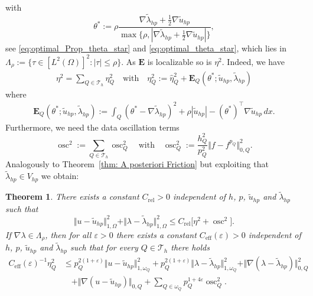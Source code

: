 \documentclass[12pt,twoside,reqno]{amsart}
\newtheorem{theorem}{Theorem}[section]
\theoremstyle{definition}
\numberwithin{equation}{section}
\newcommand{\E} {\bm{E}}
\newcommand  {\T}   {\mathscr T}
\newcommand{\norm}[1]    {\Vert #1 \Vert}
\begin{document}
            with
            \begin{equation*} %
                \theta^*:=\rho\frac{\nabla\tilde{\lambda}_{hp}+\frac12\nabla \tilde{u}_{hp}}{\max\{\rho,|\nabla\tilde{\lambda}_{hp}+\frac12 \nabla \tilde{u}_{hp}|\}},
            \end{equation*}
            see \eqref{eq:optimal_Prop_theta_star} and \eqref{eq:optimal_theta_star}, which lies in $\Lambda_\rho:=\{\tau\in [L^2(\Omega)]^2: |\tau|\leq \rho\}.$
As $\E$ is localizable so is $\eta^2$. Indeed, we have
\begin{align*}
\eta^2 = \sum\limits_{Q\in \T_h} \eta^2_Q \quad \text{with} \quad \eta^2_Q :=\hat{\eta}_Q^2 + \bm{E}_Q(\theta^*;\tilde{u}_{hp},\tilde{\lambda}_{hp})
\end{align*}
where
 \begin{align*} 
  \bm{E}_Q(\theta^*;\tilde{u}_{hp},\tilde{\lambda}_{hp}):=\int_Q (\theta^*-\nabla\tilde{\lambda}_{hp})^2+ \rho |\tilde{u}_{hp}| -(\theta^*)^\top \nabla \tilde{u}_{hp}\, dx.
 \end{align*}
      Furthermore, we need the data oscillation terms
            $$ \operatorname{osc}^2:=\sum\limits_{Q\in\T_h}\operatorname{osc}_Q^2 \quad \text{with} \quad  \operatorname{osc}_Q^2:= \frac{h_Q^2}{p_Q^2}\norm{f-f^{p_Q}}_{0,Q}^2. $$
            Analogously to Theorem~\ref{thm: A posteriori Friction} but exploiting that $\tilde{\lambda}_{hp} \in V_{hp}$ we obtain:
            \begin{theorem} \label{thm:Mosolov:Aposteriori}
                There exists a constant $C_{\text{rel}}>0$ independent of $h$, $p$, $\tilde{u}_{hp}$ and $\tilde{\lambda}_{hp}$ such that
                \begin{equation*}
                    \norm{u-\tilde{u}_{hp}}_{1,\Omega}^2+\norm{\lambda-\tilde{\lambda}_{hp}}_{1,\Omega}^2\leq C_{\text{rel}}\bigl[\eta^2+\operatorname{osc}^2\bigr].
                \end{equation*}
                If $\nabla \lambda\in \Lambda_\rho$,
                then for all $\varepsilon>0$ there exists a constant $C_{\text{eff}}(\varepsilon)>0$ independent of $h$, $p$, $\tilde{u}_{hp}$ and $\tilde{\lambda}_{hp}$ such that for every $Q \in \T_h$ there holds
                \begin{align*}
                    C_{\text{eff}}(\varepsilon)^{-1}\eta^2_Q&\leq p_Q^{2(1+\varepsilon)}\norm{u-\tilde{u}_{hp}}_{1,\omega_Q}^2+ p_Q^{2(1+\varepsilon)} \norm{\lambda-\tilde{\lambda}_{hp}}_{1,\omega_Q}^2+ \norm{\nabla(\lambda-\tilde{\lambda}_{hp})}_{0,Q}^2 \\
                    & \quad + \norm{\nabla(u-\tilde{u}_{hp})}_{0,Q}+ \sum_{Q \in \omega_Q} p_Q^{1+4\varepsilon}\operatorname{osc}_Q^2.
                \end{align*}
            \end{theorem}
            
\end{document}
